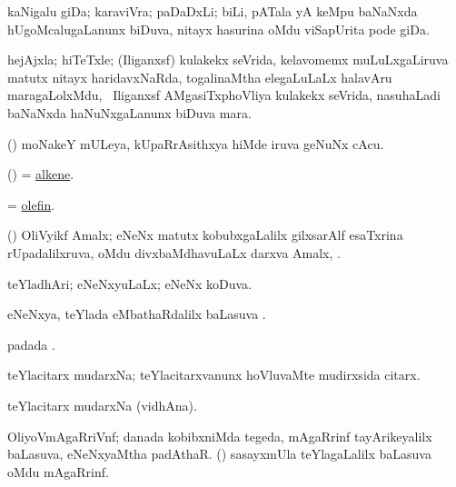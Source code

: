 \bentry
{}
\gl{\nA}
\bmng
kaNigalu giDa; karaviVra; paDaDxLi; biLi, pATala yA keMpu baNaNxda hUgoMcalugaLanunx biDuva, nitayx hasurina oMdu viSapUrita pode giDa. 
\emng
\eentry

\bentry
{}
\gl{\nA}
\bmng
hejAjxla; hiTeTxle; (Iliganxsf) kulakekx seVrida, kelavomemx muLuLxgaLiruva matutx nitayx haridavxNaRda, togalinaMtha elegaLuLaLx halavAru maragaLolxMdu, \kanmu\ Iliganxsf AMgasiTxphoVliya kulakekx seVrida, nasuhaLadi baNaNxda haNuNxgaLanunx biDuva mara. 
\emng
\eentry

\bentry
{}
\gl{\nA}
\bmng
(\aMrashA) moNakeY mULeya, kUpaRrAsithxya hiMde iruva geNuNx cAcu. 
\emng
\eentry

\bentry
{}
\gl{\nA}
\bmng
(\ravi) = \hyperref{kandict_a.pdf}{A}{alkene}{alkene}. 
\emng
\eentry

\bentry
{}
\gl{\nA}
\bmng
= \hyperlink{olefin}{olefin}. 
\emng
\eentry

\bentry
{}
\gl{\nA}
\bmng
(\ravi) OliVyikf Amalx; eNeNx matutx kobubxgaLalilx gilxsarAlf esaTxrina rUpadalilxruva, oMdu divxbaMdhavuLaLx darxva Amalx, . 
\emng
\eentry

\bentry
{}
\gl{\gu}
\bmng
teYladhAri; eNeNxyuLaLx; eNeNx koDuva. 
\emng
\eentry

\bentry
{}
\gl{\sapUpa}
\bmng
eNeNxya, teYlada eMbathaRdalilx baLasuva \sapUpa. 
\emng
\eentry

\bentry
{}
\gl{\nA}
\bmng
{} padada \saMkiSx. 
\emng
\eentry

\bentry
{}
\gl{\nA}
\bmng
teYlacitarx mudarxNa; teYlacitarxvanunx hoVluvaMte mudirxsida citarx. 
\emng
\eentry

\bentry
{}
\gl{\nA}
\bmng
teYlacitarx mudarxNa (vidhAna). 
\emng
\eentry

\bentry
{}
\gl{\nA}
\bmng
OliyoVmAgaRriVnf; 
\banum
{} danada kobibxniMda tegeda, mAgaRrinf tayArikeyalilx baLasuva, eNeNxyaMtha padAthaR. 
 (\ame) sasayxmUla teYlagaLalilx baLasuva oMdu mAgaRrinf. 
\eanum
\emng
\eentry

